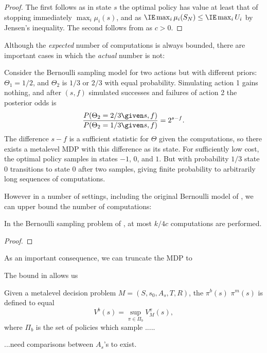 \begin{proof}
	The first follows as in state $s$ the optimal policy has value at least that
	of stopping immediately $\max_i \mu_i(s)$, and as $\IE \max_i\mu_i(S_N) \le \IE \max_i U_i$ by Jensen's inequality.
	The second follows from  as $c>0$.
\end{proof}

Although the \emph{expected} number of computations is always bounded,
there are important cases in which the \emph{actual} number is not:

\begin{example}\label{example:sprt}
Consider the Bernoulli sampling model for two actions but with different priors:
	$\Theta_1=1/2$,
	and $\Theta_2$ is $1/3$ or $2/3$ with equal probability.
%
Simulating action 1 gains nothing, and after $(s,f)$ simulated successes and failures of action 2
the posterior odds is
\[
	\frac{P(\Theta_2=2/3\given s,f)}{P(\Theta_2=1/3\given s,f)} = 2^{s-f}.
\]
The difference $s-f$ is a sufficient statistic for $\Theta$ given the computations,
so there exists a metalevel MDP with this difference as its state.  For sufficiently
low cost, the optimal policy samples in states $-1$, $0$, and $1$.  But with probability
$1/3$ state $0$ transitions to state $0$ after two samples, giving finite probability
to arbitrarily long sequences of computations.
\end{example}

However in a number of settings, including the original Bernoulli model of ,
we can upper bound the number of computations:

\begin{thm}\label{thm:bernoulli-bound}
In the Bernoulli sampling problem of ,
at most $k/4c$ computations are performed.	
\end{thm}

\begin{proof}
	
\end{proof}

As an important consequence, we can truncate the MDP to 





The bound in  allows us



\begin{dfn}
	Given a metalevel decision problem $M=(S,s_0,A_s,T,R)$,
	the  $\pi^b(s)$  $\pi^m(s)$ is defined to equal
	\begin{equation}\label{eq:blinkered}
		V^b(s) = \sup_{\pi\in\Pi_b} V^\pi_M(s),
	\end{equation}
	where $\Pi_b$ is the set of policies which sample .....
	
	...need comparisons between $A_s$'s to exist.
\end{dfn}

